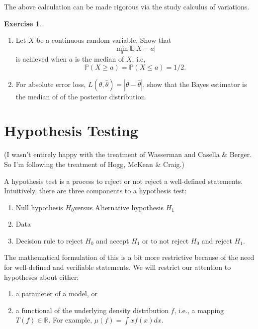 \documentclass[
  openany]{book}
\providecommand{\tightlist}{%
  \setlength{\itemsep}{0pt}\setlength{\parskip}{0pt}}
\theoremstyle{definition}
\theoremstyle{definition}
\theoremstyle{definition}
\newtheorem{exercise}{Exercise}[chapter]
\theoremstyle{definition}
\theoremstyle{remark}
\begin{document}
The above calculation can be made rigorous via the study calculus of variations.

\begin{exercise}
\leavevmode

\begin{enumerate}
\def\labelenumi{\arabic{enumi}.}
\item
  Let \(X\) be a continuous random variable. Show that
  \[\min_a \mathbb{E}|X - a|\]
  is achieved when \(a\) is the median of \(X\), i.e,
  \[ \mathbb{P}(X\geq a) = \mathbb{P}(X\leq a) = 1/2.\]
\item
  For absolute error loss, \(L(\theta,\hat \theta) = |\theta - \hat \theta|\), show that
  the Bayes estimator is the median of of the posterior distribution.
\end{enumerate}

\end{exercise}

\hypertarget{hypothesis-testing}{%
\chapter{Hypothesis Testing}\label{hypothesis-testing}}

(I wasn't entirely happy with the treatment of Wasserman and Casella \& Berger.
So I'm following the treatment of Hogg, McKean \& Craig.)

A hypothesis test is a process to reject or not reject a well-defined statements.
Intuitively, there are three components to a hypothesis test:

\begin{enumerate}
\def\labelenumi{\arabic{enumi}.}
\tightlist
\item
  Null hypothesis \(H_0\)versus Alternative hypothesis \(H_1\)
\item
  Data
\item
  Decision rule to reject \(H_0\) and accept \(H_1\) or to not reject \(H_0\) and reject \(H_1\).
\end{enumerate}

The mathematical formulation of this is a bit more restrictive because of the
need for well-defined and verifiable statements.
We will restrict our attention to hypotheses about either:

\begin{enumerate}
\def\labelenumi{\arabic{enumi}.}
\tightlist
\item
  a parameter of a model, or
\item
  a functional of the underlying density distribution \(f\), i.e., a mapping \(T(f) \in \mathbb{R}\).
  For example, \(\mu(f) = \int x f(x) dx\).
\end{enumerate}
\end{document}
